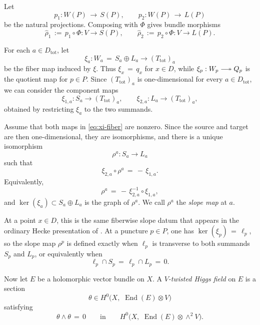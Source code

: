 \documentclass[a4paper,12pt]{amsart}
\numberwithin{equation}{section}
\theoremstyle{definition}
\newcommand{\End}{\operatorname{End}}
\newcommand{\longtwoheadrightarrow}{\mathrel{\relbar\joinrel\twoheadrightarrow}}
\begin{document}
Let
\[
p_1:W(P)\,\longrightarrow\, S(P),\qquad p_2:W(P)\,\longrightarrow\, L(P)
\]
be the natural projections.  Composing with \(\Phi\) gives bundle morphisms
\begin{equation}\label{eq:rho-hat}
\widehat{\rho}_1\,:=\,p_1\circ\Phi:V\longrightarrow S(P),\qquad
\widehat{\rho}_2\,:=\,p_2\circ\Phi:V\longrightarrow L(P).
\end{equation}

For each \(a\in D_{\mathrm{tot}}\), let
\[
\xi_a:W_a\,=\,S_a\oplus L_a\longrightarrow (T_{\mathrm{tot}})_a
\]
be the fiber map induced by \(\xi\).  Thus \(\xi_x\,=\,q_x\) for \(x\in D\), while \(\xi_p:W_p\longtwoheadrightarrow Q_p\) is the quotient map for \(p\in P\).  Since \((T_{\mathrm{tot}})_a\) is one-dimensional for every \(a\in D_{\mathrm{tot}}\), we can consider the component maps
\begin{equation}\label{eq:xi-fiber}
\xi_{1,a}:S_a\longrightarrow (T_{\mathrm{tot}})_a,\qquad
\xi_{2,a}:L_a\longrightarrow (T_{\mathrm{tot}})_a,
\end{equation}
obtained by restricting \(\xi_a\) to the two summands.

Assume that both maps in \eqref{eq:xi-fiber} are nonzero.  Since the source and target are then one-dimensional, they are isomorphisms, and there is a unique isomorphism
\begin{equation}\label{eq:rho-a}
\rho^a:S_a\longrightarrow L_a
\end{equation}
such that
\[
\xi_{2,a}\circ \rho^a\,=\,-\,\xi_{1,a}.
\]
Equivalently,
\[
\rho^a\,=\,-\,\xi_{2,a}^{-1}\circ \xi_{1,a},
\]
and \(\ker(\xi_a)\subset S_a\oplus L_a\) is the graph of \(\rho^a\).  We call \(\rho^a\) the \emph{slope map} at \(a\).

At a point \(x\in D\), this is the same fiberwise slope datum that appears in the ordinary Hecke presentation of \cite{ABK}.  At a puncture \(p\in P\), one has \(\ker(\xi_p)\,=\,\ell_p\), so the slope map \(\rho^p\) is defined exactly when \(\ell_p\) is transverse to both summands \(S_p\) and \(L_p\), or equivalently when
\[
\ell_p\cap S_p\,=\,\ell_p\cap L_p\,=\,0.
\]

Now let \(E\) be a holomorphic vector bundle on \(X\).  A \emph{\(V\)-twisted Higgs field} on \(E\) is a section
\[
\theta\in H^0\bigl(X,\,\, \End(E)\otimes V\bigr)
\]
satisfying
\begin{equation}\label{eq:integrability}
\theta\wedge\theta\,=\,0
\qquad\text{in}\qquad
H^0\bigl(X,\,\, \End(E)\otimes \wedge^2V\bigr).
\end{equation}
\end{document}
